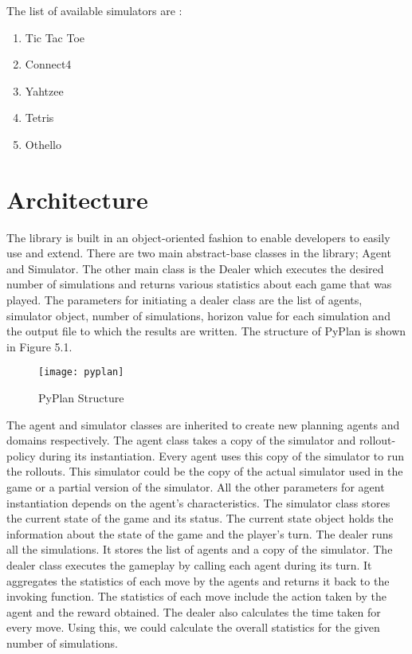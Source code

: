 \documentclass[double,12pt]{beavtex}
\begin{document}
\noindent The list of available simulators are :

\begin{enumerate}
\item Tic Tac Toe
\item Connect4
\item Yahtzee
\item Tetris
\item Othello
\end{enumerate}

\section{Architecture}
The library is built in an object-oriented fashion to enable developers to easily use and extend. There are two main abstract-base classes in the library; Agent and Simulator. The other main class is the Dealer which executes the desired number of simulations and returns various statistics about each game that was played. The parameters for initiating a dealer class are the list of agents, simulator object, number of simulations, horizon value for each simulation and the output file to which the results are written. The structure of PyPlan is shown in Figure 5.1. 

\begin{figure}[!ht]
\centering
\texttt{[image: pyplan]}
\caption{PyPlan Structure}
\end{figure}

The agent and simulator classes are inherited to create new planning agents and domains respectively. The agent class takes a copy of the simulator and rollout-policy during its instantiation. Every agent uses this copy of the simulator to run the rollouts. This simulator could be the copy of the actual simulator used in the game or a partial version of the simulator. All the other parameters for agent instantiation depends on the agent's characteristics. The simulator class stores the current state of the game and its status. The current state object holds the information about the state of the game and the player's turn. The dealer runs all the simulations. It stores the list of agents and a copy of the simulator. The dealer class executes the gameplay by calling each agent during its turn. It aggregates the statistics of each move by the agents and returns it back to the invoking function. The statistics of each move include the action taken by the agent and the reward obtained. The dealer also calculates the time taken for every move. Using this, we could calculate the overall statistics for the given number of simulations.
\end{document}
